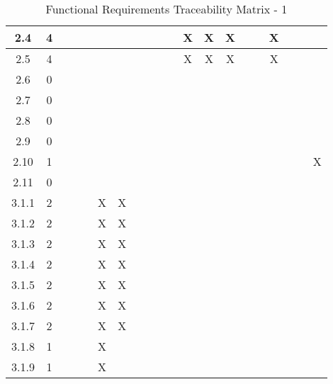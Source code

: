 \documentclass[titlepage]{article}
\begin{document}
\begin{center}
\begin{table}[h!]
\begin{tabular}{|c|c|c|c|c |c|c|c|c|c |c|c|c|c|c |c|c|c|c|c|}
2.4 &4&&& &&&&& &&X&X&X& &&X&&&\\\hline
2.5 &4&&& &&&&& &&X&X&X& &&X&&&\\\hline
2.6 &0&&& &&&&& &&&&& &&&&&\\\hline
2.7 &0&&& &&&&& &&&&& &&&&&\\\hline
2.8 &0&&& &&&&& &&&&& &&&&&\\\hline
2.9 &0&&& &&&&& &&&&& &&&&&\\\hline
2.10 &1&&& &&&&& &&&&& &&&&&X\\\hline
2.11 &0&&& &&&&& &&&&& &&&&&\\\hline
3.1.1 &2&&& &X&X&&& &&&&& &&&&&\\\hline
3.1.2 &2&&& &X&X&&& &&&&& &&&&&\\\hline
3.1.3 &2&&& &X&X&&& &&&&& &&&&&\\\hline
3.1.4 &2&&& &X&X&&& &&&&& &&&&&\\\hline
3.1.5 &2&&& &X&X&&& &&&&& &&&&&\\\hline
3.1.6 &2&&& &X&X&&& &&&&& &&&&&\\\hline
3.1.7 &2&&& &X&X&&& &&&&& &&&&&\\\hline
3.1.8 &1&&& &X&&&& &&&&& &&&&&\\\hline
3.1.9 &1&&& &X&&&& &&&&& &&&&&\\\hline
\end{tabular}
\caption{Functional Requirements Traceability Matrix - 1}
\end{table}
\end{center}
\end{document}
